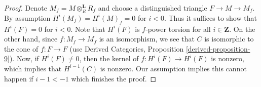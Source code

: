 \documentclass[10pt,a4paper]{amsart}
\theoremstyle{plain}
\theoremstyle{definition}
\theoremstyle{remark}
\numberwithin{equation}{subsection}
\begin{document}
\begin{proof}
Denote $M_f = M \otimes_R^\mathbf{L} R_f$ and choose a distinguished
triangle $F \to M \to M_f$. By assumption $H^i(M_f) = H^i(M)_f = 0$
for $i < 0$. Thus it suffices to show that $H^i(F) = 0$ for $i < 0$.
Note that $H^i(F)$ is $f$-power torsion for all $i \in \mathbf{Z}$.
On the other hand, since $f : M_f \to M_f$ is an isomorphism, we see that
$C$ is isomorphic to the cone of $f : F \to F$
(use Derived Categories, Proposition \ref{derived-proposition-9}).
Now, if $H^i(F) \not = 0$, then the kernel of $f : H^i(F) \to H^i(F)$
is nonzero, which implies that $H^{i - 1}(C)$ is nonzero. Our assumption
implies this cannot happen if $i - 1 < -1$ which finishes the proof.
\end{proof}
\end{document}
